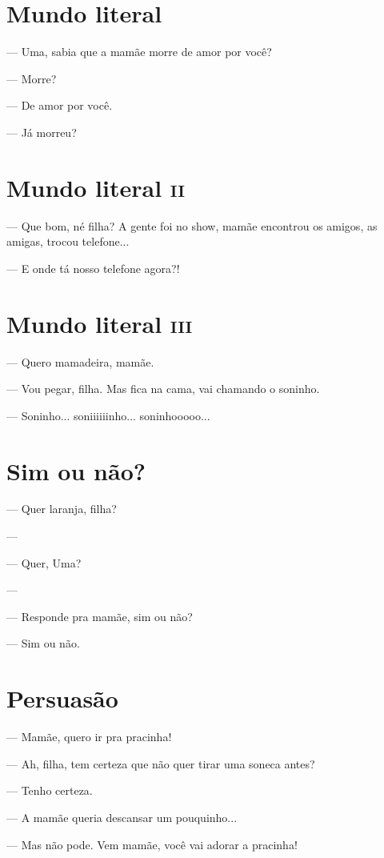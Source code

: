 {\chapter{Mundo literal}

— Uma, sabia que a mamãe morre de amor por você?

— Morre?

— De amor por você.

— Já morreu?

\chapter{Mundo literal \textsc{ii}}

— Que bom, né filha? A gente foi no show, mamãe encontrou os amigos, as
amigas, trocou telefone...

— E onde tá nosso telefone agora?!

\chapter{Mundo literal \textsc{iii}}

— Quero mamadeira, mamãe.

— Vou pegar, filha. Mas fica na cama, vai chamando o soninho.

— Soninho... soniiiiiinho... soninhooooo...

\chapter{Sim ou não?}

— Quer laranja, filha?

—

— Quer, Uma?

—

— Responde pra mamãe, sim ou não?

— Sim ou não.

\chapter{Persuasão}

— Mamãe, quero ir pra pracinha!

— Ah, filha, tem certeza que não quer tirar uma soneca antes?

— Tenho certeza.

— A mamãe queria descansar um pouquinho...

— Mas não pode. Vem mamãe, você vai adorar a pracinha!

}
